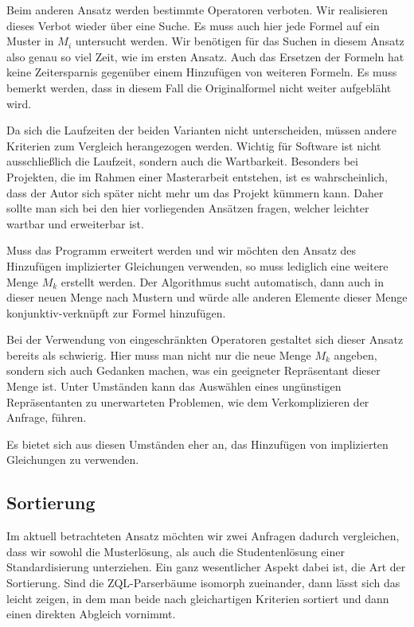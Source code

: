 Beim anderen Ansatz werden bestimmte Operatoren verboten. Wir realisieren dieses Verbot wieder über eine Suche. Es muss auch hier jede Formel auf ein Muster in $M_i$ untersucht werden. Wir benötigen für das Suchen in diesem Ansatz also genau so viel Zeit, wie im ersten Ansatz. Auch das Ersetzen der Formeln hat keine Zeitersparnis gegenüber einem Hinzufügen von weiteren Formeln. Es muss bemerkt werden, dass in diesem Fall die Originalformel nicht weiter aufgebläht wird.

Da sich die Laufzeiten der beiden Varianten nicht unterscheiden, müssen andere Kriterien zum Vergleich herangezogen werden. Wichtig für Software ist nicht ausschließlich die Laufzeit, sondern auch die Wartbarkeit. Besonders bei Projekten, die im Rahmen einer Masterarbeit entstehen, ist es wahrscheinlich, dass der Autor sich später nicht mehr um das Projekt kümmern kann. Daher sollte man sich bei den hier vorliegenden Ansätzen fragen, welcher leichter wartbar und erweiterbar ist.

Muss das Programm erweitert werden und wir möchten den Ansatz des Hinzufügen implizierter Gleichungen verwenden, so muss lediglich eine weitere Menge $M_k$ erstellt werden. Der Algorithmus sucht automatisch, dann auch in dieser neuen Menge nach Mustern und würde alle anderen Elemente dieser Menge konjunktiv-verknüpft zur Formel hinzufügen. 

Bei der Verwendung von eingeschränkten Operatoren gestaltet sich dieser Ansatz bereits als schwierig. Hier muss man nicht nur die neue Menge $M_k$ angeben, sondern sich auch Gedanken machen, was ein geeigneter Repräsentant dieser Menge ist. Unter Umständen kann das Auswählen eines ungünstigen Repräsentanten zu unerwarteten Problemen, wie dem Verkomplizieren der Anfrage, führen.

Es bietet sich aus diesen Umständen eher an, das Hinzufügen von implizierten Gleichungen zu verwenden.

\subsection{Sortierung}

Im aktuell betrachteten Ansatz möchten wir zwei Anfragen dadurch vergleichen, dass wir sowohl die Musterlösung, als auch die Studentenlösung einer Standardisierung unterziehen. Ein ganz wesentlicher Aspekt dabei ist, die Art der Sortierung. Sind die ZQL-Parserbäume isomorph zueinander, dann lässt sich das leicht zeigen, in dem man beide nach gleichartigen Kriterien sortiert und dann einen direkten Abgleich vornimmt.


